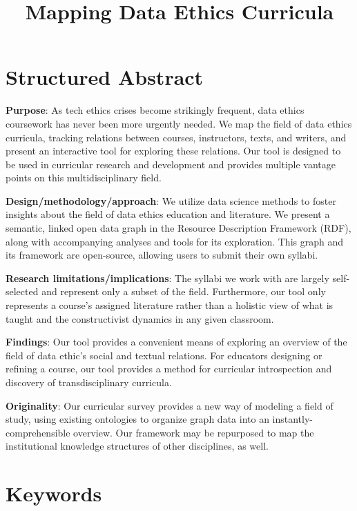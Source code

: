 \documentclass[
]{article}
\title{Mapping Data Ethics Curricula}
\author{}
\date{}
\begin{document}
\maketitle

\hypertarget{structured-abstract}{%
\section{Structured Abstract}\label{structured-abstract}}

\textbf{Purpose}: As tech ethics crises become strikingly frequent, data
ethics coursework has never been more urgently needed. We map the field
of data ethics curricula, tracking relations between courses,
instructors, texts, and writers, and present an interactive tool for
exploring these relations. Our tool is designed to be used in curricular
research and development and provides multiple vantage points on this
multidisciplinary field.

\textbf{Design/methodology/approach}: We utilize data science methods to
foster insights about the field of data ethics education and literature.
We present a semantic, linked open data graph in the Resource
Description Framework (RDF), along with accompanying analyses and tools
for its exploration. This graph and its framework are open-source,
allowing users to submit their own syllabi.

\textbf{Research limitations/implications}: The syllabi we work with are
largely self-selected and represent only a subset of the field.
Furthermore, our tool only represents a course's assigned literature
rather than a holistic view of what is taught and the constructivist
dynamics in any given classroom.

\textbf{Findings}: Our tool provides a convenient means of exploring an
overview of the field of data ethic's social and textual relations. For
educators designing or refining a course, our tool provides a method for
curricular introspection and discovery of transdisciplinary curricula.

\textbf{Originality}: Our curricular survey provides a new way of
modeling a field of study, using existing ontologies to organize graph
data into an instantly-comprehensible overview. Our framework may be
repurposed to map the institutional knowledge structures of other
disciplines, as well.

\hypertarget{keywords}{%
\section{Keywords}\label{keywords}}
\end{document}
